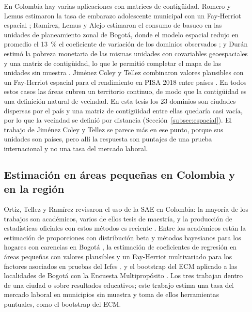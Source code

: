 En Colombia hay varias aplicaciones con matrices de contigüidad. Romero y Lemus estimaron la tasa de embarazo adolescente municipal con un Fay-Herriot espacial \cite[pp.~1, 10]{RomeroLemus2018}; Ramírez, Lemus y Alejo estimaron el consumo de basuco en las unidades de planeamiento zonal de Bogotá, donde el modelo espacial redujo en promedio el 13~\% el coeficiente de variación de los dominios observados \cite[p.~14]{VargasLemusAlejo2018}; y Durán estimó la pobreza monetaria de las mismas unidades con covariables geoespaciales y una matriz de contigüidad, lo que le permitió completar el mapa de las unidades sin muestra \cite[pp.~32--33]{Duran2024}. Jiménez Coley y Tellez combinaron valores plausibles con un Fay-Herriot espacial para el rendimiento en PISA 2018 entre países \cite{ColeyTellez2024}. En todos estos casos las áreas cubren un territorio continuo, de modo que la contigüidad es una definición natural de vecindad. En esta tesis los 23 dominios son ciudades dispersas por el país y una matriz de contigüidad entre ellas quedaría casi vacía, por lo que la vecindad se definió por distancia (Sección~\ref{subsec:espacial}). El trabajo de Jiménez Coley y Tellez se parece más en ese punto, porque sus unidades son países, pero allí la respuesta son puntajes de una prueba internacional y no una tasa del mercado laboral.

\subsection{Estimación en áreas pequeñas en Colombia y en la región}

Ortiz, Tellez y Ramírez revisaron el uso de la SAE en Colombia: la mayoría de los trabajos son académicos, varios de ellos tesis de maestría, y la producción de estadísticas oficiales con estos métodos es reciente \cite[pp.~407, 413]{OrtizTellezRamirez2024}. Entre los académicos están la estimación de proporciones con distribución beta y métodos bayesianos para los hogares con carencias en Bogotá \cite[pp.~IV, 34]{BernalGonzalez2017}, la estimación de coeficientes de regresión en áreas pequeñas con valores plausibles y un Fay-Herriot multivariado para los factores asociados en pruebas del Icfes \cite[pp.~18, 70]{GuerreroTrujillo2019}, y el bootstrap del ECM aplicado a las localidades de Bogotá con la Encuesta Multipropósito \cite[pp.~VIII, 26]{Montoya2019}. Los tres trabajan dentro de una ciudad o sobre resultados educativos; este trabajo estima una tasa del mercado laboral en municipios sin muestra y toma de ellos herramientas puntuales, como el bootstrap del ECM.

